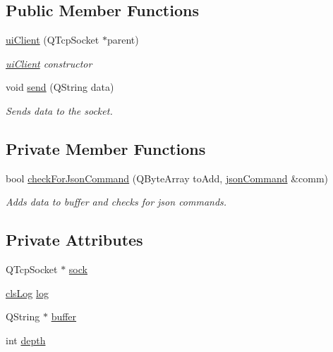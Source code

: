 \subsection*{Public Member Functions}
\begin{DoxyCompactItemize}
\item 
\hyperlink{classserver_1_1ui_client_a215d811cbfada73ff8344ed7e5664113}{ui\-Client} (Q\-Tcp\-Socket $\ast$parent)
\begin{DoxyCompactList}\small\item\em \hyperlink{classserver_1_1ui_client}{ui\-Client} constructor \end{DoxyCompactList}\item 
void \hyperlink{classserver_1_1ui_client_ad3f8f8690155b186b54e40dcfee0df23}{send} (Q\-String data)
\begin{DoxyCompactList}\small\item\em Sends data to the socket. \end{DoxyCompactList}\end{DoxyCompactItemize}
\subsection*{Private Member Functions}
\begin{DoxyCompactItemize}
\item 
bool \hyperlink{classserver_1_1ui_client_a8237b1a02c7877a7c853b6ef23995b9b}{check\-For\-Json\-Command} (Q\-Byte\-Array to\-Add, \hyperlink{class_k4_u_1_1json_command}{json\-Command} \&comm)
\begin{DoxyCompactList}\small\item\em Adds data to buffer and checks for json commands. \end{DoxyCompactList}\end{DoxyCompactItemize}
\subsection*{Private Attributes}
\begin{DoxyCompactItemize}
\item 
Q\-Tcp\-Socket $\ast$ \hyperlink{classserver_1_1ui_client_af7c6a86556bf18c15c06692b636a2d1a}{sock}
\item 
\hyperlink{class_k4_u_1_1cls_log}{cls\-Log} \hyperlink{classserver_1_1ui_client_a446457889b90bd163b4d50fed2792cf0}{log}
\item 
Q\-String $\ast$ \hyperlink{classserver_1_1ui_client_a102a1aab0f3e076a042b709d1d627f93}{buffer}
\item 
int \hyperlink{classserver_1_1ui_client_a396480feb2fc63a8eac9b737d53bf7ba}{depth}
\end{DoxyCompactItemize}


